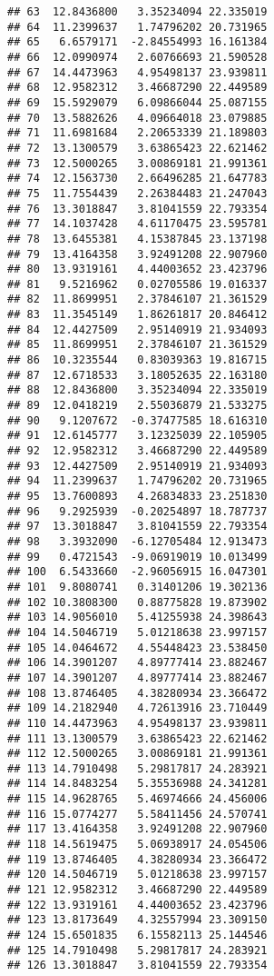 \documentclass[]{article}
\begin{document}
\begin{verbatim}
## 63  12.8436800   3.35234094 22.335019
## 64  11.2399637   1.74796202 20.731965
## 65   6.6579171  -2.84554993 16.161384
## 66  12.0990974   2.60766693 21.590528
## 67  14.4473963   4.95498137 23.939811
## 68  12.9582312   3.46687290 22.449589
## 69  15.5929079   6.09866044 25.087155
## 70  13.5882626   4.09664018 23.079885
## 71  11.6981684   2.20653339 21.189803
## 72  13.1300579   3.63865423 22.621462
## 73  12.5000265   3.00869181 21.991361
## 74  12.1563730   2.66496285 21.647783
## 75  11.7554439   2.26384483 21.247043
## 76  13.3018847   3.81041559 22.793354
## 77  14.1037428   4.61170475 23.595781
## 78  13.6455381   4.15387845 23.137198
## 79  13.4164358   3.92491208 22.907960
## 80  13.9319161   4.44003652 23.423796
## 81   9.5216962   0.02705586 19.016337
## 82  11.8699951   2.37846107 21.361529
## 83  11.3545149   1.86261817 20.846412
## 84  12.4427509   2.95140919 21.934093
## 85  11.8699951   2.37846107 21.361529
## 86  10.3235544   0.83039363 19.816715
## 87  12.6718533   3.18052635 22.163180
## 88  12.8436800   3.35234094 22.335019
## 89  12.0418219   2.55036879 21.533275
## 90   9.1207672  -0.37477585 18.616310
## 91  12.6145777   3.12325039 22.105905
## 92  12.9582312   3.46687290 22.449589
## 93  12.4427509   2.95140919 21.934093
## 94  11.2399637   1.74796202 20.731965
## 95  13.7600893   4.26834833 23.251830
## 96   9.2925939  -0.20254897 18.787737
## 97  13.3018847   3.81041559 22.793354
## 98   3.3932090  -6.12705484 12.913473
## 99   0.4721543  -9.06919019 10.013499
## 100  6.5433660  -2.96056915 16.047301
## 101  9.8080741   0.31401206 19.302136
## 102 10.3808300   0.88775828 19.873902
## 103 14.9056010   5.41255938 24.398643
## 104 14.5046719   5.01218638 23.997157
## 105 14.0464672   4.55448423 23.538450
## 106 14.3901207   4.89777414 23.882467
## 107 14.3901207   4.89777414 23.882467
## 108 13.8746405   4.38280934 23.366472
## 109 14.2182940   4.72613916 23.710449
## 110 14.4473963   4.95498137 23.939811
## 111 13.1300579   3.63865423 22.621462
## 112 12.5000265   3.00869181 21.991361
## 113 14.7910498   5.29817817 24.283921
## 114 14.8483254   5.35536988 24.341281
## 115 14.9628765   5.46974666 24.456006
## 116 15.0774277   5.58411456 24.570741
## 117 13.4164358   3.92491208 22.907960
## 118 14.5619475   5.06938917 24.054506
## 119 13.8746405   4.38280934 23.366472
## 120 14.5046719   5.01218638 23.997157
## 121 12.9582312   3.46687290 22.449589
## 122 13.9319161   4.44003652 23.423796
## 123 13.8173649   4.32557994 23.309150
## 124 15.6501835   6.15582113 25.144546
## 125 14.7910498   5.29817817 24.283921
## 126 13.3018847   3.81041559 22.793354

\end{verbatim}
\end{document}
